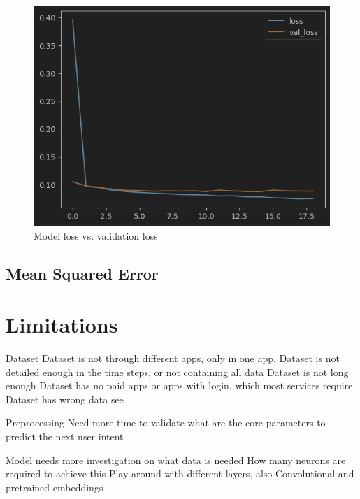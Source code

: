 \begin{figure}[htbp!]
  \centering
  \includegraphics[width=\textwidth]{graphics/model_history_loss}
  \caption[Model loss vs. validation loss]{Model loss vs. validation loss}
  \label{fig:model_history_loss}
\end{figure}

\subsection{Mean Squared Error}

\section{Limitations}

Dataset
Dataset is not through different apps, only in one app.
Dataset is not detailed enough in the time steps, or not containing all data
Dataset is not long enough
Dataset has no paid apps or apps with login, which most services require
Dataset has wrong data see \cite{clay}

Preprocessing
Need more time to validate what are the core parameters to predict the next user intent


Model needs more investigation on what data is needed
How many neurons are required to achieve this
Play around with different layers, also Convolutional and pretrained embeddings

